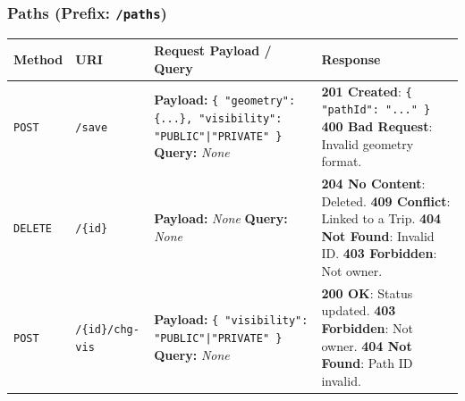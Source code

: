 \subsubsection*{Paths (Prefix: \texttt{/paths})}
\begin{table}[H]
    \sf
    \small
    \centering
    \renewcommand{\arraystretch}{1.5}
    \begin{tabularx}{\textwidth}{|l|p{2.5cm}|p{4cm}|X|}
    \hline
    \rowcolor{lightgray}\textbf{Method} & \textbf{URI} & \textbf{Request Payload / Query} & \textbf{Response} \\ \hline
    
    \texttt{POST} & \texttt{/save} & 
    \textbf{Payload:} \newline \texttt{\{ "geometry": \{...\}, \newline "visibility": \newline "PUBLIC"|"PRIVATE" \}} \newline \textbf{Query:} \newline \textit{None} & 
    \textbf{201 Created}: \newline \texttt{\{ "pathId": "..." \}} \newline
    \textbf{400 Bad Request}: Invalid geometry format. \\ \hline
    
    \texttt{DELETE} & \texttt{/\{id\}} & 
    \textbf{Payload:} \newline \textit{None} \newline \textbf{Query:} \newline \textit{None} & 
    \textbf{204 No Content}: Deleted. \newline
    \textbf{409 Conflict}: Linked to a Trip. \newline
    \textbf{404 Not Found}: Invalid ID. \newline
    \textbf{403 Forbidden}: Not owner. \\ \hline
    
    \texttt{POST} & \texttt{/\{id\}/chg-vis} & 
    \textbf{Payload:} \newline \texttt{\{ "visibility": \newline "PUBLIC"|"PRIVATE" \}} \newline \textbf{Query:} \newline \textit{None} & 
    \textbf{200 OK}: Status updated. \newline
    \textbf{403 Forbidden}: Not owner. \newline
    \textbf{404 Not Found}: Path ID invalid. \\ \hline
    

\end{tabularx}
\end{table}
